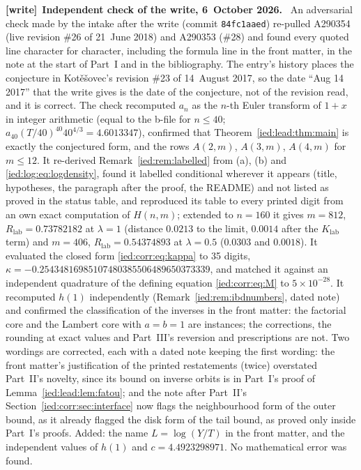 \documentclass[11pt,letterpaper]{article}
\theoremstyle{remark}\newtheorem{remark}[theorem]{Remark}
\newcommand{\file}[1]{\nolinkurl{#1}}
\newenvironment{writenote}[1][]{\par\smallskip\begingroup\small
 \noindent\textbf{[write]}\if\relax\detokenize{#1}\relax\else~\textbf{#1.}\fi\ }%
 {\par\endgroup\smallskip}
\begin{document}
\begin{writenote}[Independent check of the write, 6~October 2026]
An adversarial check made by the intake after the write (commit \file{84fc1aaed}) re-pulled A290354 (live revision \#26 of 21~June 2018) and A290353 (\#28) and found every quoted line character for character, including the formula line in the front matter, in the note at the start of Part~I and in the bibliography. The entry's history places the conjecture in Kot\v{e}\v{s}ovec's revision \#23 of 14~August 2017, so the date ``Aug 14 2017'' that the write gives is the date of the conjecture, not of the revision read, and it is correct. The check recomputed $a_n$ as the $n$-th Euler transform of $1+x$ in integer arithmetic (equal to the b-file for $n\le40$; $a_{40}(T/40)^{40}40^{4/3}=4.6013347$), confirmed that Theorem~\ref{ied:lead:thm:main} is exactly the conjectured form, and the rows $A(2,m)$, $A(3,m)$, $A(4,m)$ for $m\le12$. It re-derived Remark~\ref{ied:rem:labelled} from (a), (b) and \eqref{ied:log:eq:logdensity}, found it labelled conditional wherever it appears (title, hypotheses, the paragraph after the proof, the README) and not listed as proved in the status table, and reproduced its table to every printed digit from an own exact computation of $H(n,m)$; extended to $n=160$ it gives $m=812$, $R_{\mathrm{lab}}=0.73782182$ at $\lambda=1$ (distance $0.0213$ to the limit, $0.0014$ after the $K_{\mathrm{lab}}$ term) and $m=406$, $R_{\mathrm{lab}}=0.54374893$ at $\lambda=0.5$ ($0.0303$ and $0.0018$). It evaluated the closed form \eqref{ied:corr:eq:kappa} to 35 digits, $\kappa=-0.25434816985107480385506489650373339$, and matched it against an independent quadrature of the defining equation \eqref{ied:corr:eq:M} to $5\times10^{-28}$. It recomputed $h(1)$ independently (Remark~\ref{ied:rem:ibdnumbers}, dated note) and confirmed the classification of the inverses in the front matter: the factorial core and the Lambert core with $a=b=1$ are instances; the corrections, the rounding at exact values and Part~III's reversion and prescriptions are not. Two wordings are corrected, each with a dated note keeping the first wording: the front matter's justification of the printed restatements (twice) overstated Part~II's novelty, since its bound on inverse orbits is in Part~I's proof of Lemma~\ref{ied:lead:lem:fatou}; and the note after Part~II's Section~\ref{ied:corr:sec:interface} now flags the neighbourhood form of the outer bound, as it already flagged the disk form of the tail bound, as proved only inside Part~I's proofs. Added: the name $L=\log(Y/T)$ in the front matter, and the independent values of $h(1)$ and $c=4.4923298971$. No mathematical error was found.
\end{writenote}
\end{document}
